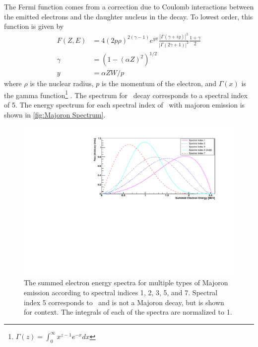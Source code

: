 The Fermi function comes from a correction due to Coulomb interactions between the emitted electrons and the daughter nucleus in the decay.
To lowest order, this function is given by 
\begin{align}
    F(Z,E) &= 4(2 p \rho)^{2(\gamma - 1)}e^{y\pi} \frac{|\Gamma(\gamma+iy)|^2}{|\Gamma(2\gamma+1)|^2}\frac{1+\gamma}{2} \\
    \gamma &= (1-(\alpha Z)^2)^{1/2} \\
    y &= \alpha Z W / p
\end{align}
where $\rho$ is the nuclear radius, $p$ is the momentum of the electron, and $\Gamma(x)$ is the gamma function\footnote{$\Gamma(z)=\int_0^\infty x^{z-1}e^{-x}dx$} \cite{PhysRev.150.846}.
The spectrum for \twonubb~decay corresponds to a spectral index of 5.
The energy spectrum for each spectral index of \zeronubb~with majoron emission is shown in \autoref{fig:Majoron Spectrum}.

\begin{figure}[htbp]
    \centering
    \includegraphics[width=0.9\linewidth]{Figures/EnergySpectrum_fixedFermi.pdf}
    \caption[The summed electron energy spectra for multiple types of Majoron emission according to spectral indices 1, 2, 3, 5, and 7.]
    {The summed electron energy spectra for multiple types of Majoron emission according to spectral indices 1, 2, 3, 5, and 7.
    Spectral index 5 corresponds to \twonubb~and is not a Majoron decay, but is shown for context.
    The integrals of each of the spectra are normalized to 1.}
    \label{fig:Majoron Spectrum}
\end{figure}

